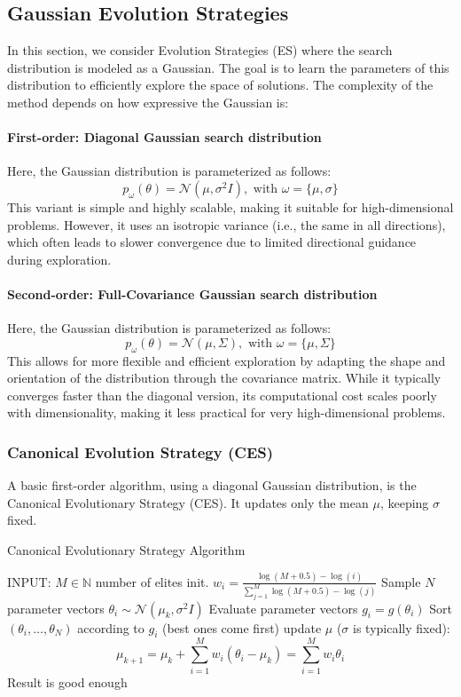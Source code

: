 \subsection{Gaussian Evolution Strategies}
In this section, we consider Evolution Strategies (ES) where the search distribution is modeled as a Gaussian. 
The goal is to learn the parameters of this distribution to efficiently explore the space of solutions. The complexity 
of the method depends on how expressive the Gaussian is:

\paragraph{First-order: Diagonal Gaussian search distribution}
Here, the Gaussian distribution is parameterized as follows:
$$p_\omega(\theta) = \mathcal{N}(\mu,\sigma^2I), \text{ with } \omega = \{\mu,\sigma\}$$
This variant is simple and highly scalable, making it suitable for high-dimensional problems. However, it uses an isotropic 
variance (i.e., the same in all directions), which often leads to slower convergence due to limited directional guidance 
during exploration.

\paragraph{Second-order: Full-Covariance Gaussian search distribution}
Here, the Gaussian distribution is parameterized as follows:
$$p_\omega(\theta) = \mathcal{N}(\mu,\Sigma), \text{ with } \omega = \{\mu,\Sigma\}$$
This allows for more flexible and efficient exploration by adapting the shape and orientation of the distribution 
through the covariance matrix. While it typically converges faster than the diagonal version, its computational 
cost scales poorly with dimensionality, making it less practical for very high-dimensional problems.

\subsubsection{ Canonical Evolution Strategy (CES)}
A basic first-order algorithm, using a diagonal Gaussian distribution, is the Canonical Evolutionary Strategy (CES). It 
updates only the mean $\mu$, keeping $\sigma$ fixed.
\begin{algorithm}[H]
   \large
    \caption{Canonical Evolutionary Strategy Algorithm}\label{ces}
    \begin{algorithmic}
    \STATE INPUT: $M \in \mathbb{N}$ number of elites 
    \STATE init. $w_i = \frac{\log{(M+0.5)}-\log{(i)}}{\sum_{j=1}^M \log{(M+0.5)}-\log{(j)}}$
    \REPEAT
    \STATE Sample $N$ parameter vectors $\theta_i\sim \mathcal{N}(\mu_k,\sigma^2 I)$
    \STATE Evaluate parameter vectors $g_i = g(\theta_i)$
    \STATE Sort $(\theta_i,\dots,\theta_N)$ according to $g_i$ (best ones come first)
    \STATE update $\mu$ ($\sigma$ is typically fixed): $$\mu_{k+1} = \mu_k + \sum_{i=1}^M w_i(\theta_i-\mu_k)= \sum_{i=1}^M w_i\theta_i$$
    \UNTIL Result is good enough
    \end{algorithmic}
\end{algorithm}

